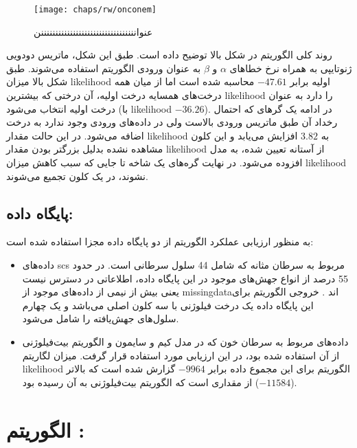 \begin{figure}[!ht]
	\centerline{\texttt{[image: chaps/rw/onconem]}}
	\caption{عنوانننننننننننننننننننننننننننننننننن}
	\label{fig:ch_rw:onconem}
\end{figure}


روند کلی الگوریتم  در شکل بالا توضیح داده است. طبق این شکل، ماتریس دودویی ژنوتایپی به همراه نرخ خطاهای $\alpha$ و $\beta$ به عنوان ورودی الگوریتم استفاده می‌شوند. طبق شکل بالا میزان \gls{likelihood} اولیه برابر $-47.61$  محاسبه شده است اما از میان همه درخت‌های همسایه درخت اولیه، آن درختی که بیشترین \gls{likelihood} را دارد به عنوان درخت اولیه انتخاب می‌شود (با \gls{likelihood} $-36.26$). در ادامه یک گرهای که احتمال رخداد آن طبق ماتریس ورودی بالاست ولی در داده‌های ورودی وجود ندارد به درخت اضافه می‌شود. در این حالت مقدار \gls{likelihood} به $3.82$ افزایش می‌یابد و این کلون مشاهده نشده بدلیل بزرگتر بودن مقدار \gls{likelihood} از آستانه تعیین شده، به مدل افزوده می‌شود. در نهایت گره‌های یک شاخه تا جایی که سبب کاهش میزان \gls{likelihood} نشوند، در یک کلون تجمیع می‌شوند. 


\subsection{پایگاه داده: }

به منظور ارزیابی عملکرد الگوریتم  از دو پایگاه داده مجزا استفاده شده است: 



\begin{itemize}
	\item     داده‌های  \gls{scs} مربوط به سرطان مثانه که شامل 44 سلول سرطانی است. در حدود 55 درصد از انواع جهش‌های موجود در این پایگاه داده، اطلاعاتی در دسترس نیست یعنی بیش از نیمی از داده‌های موجود از \gls{missingdata}‌اند . خروجی الگوریتم  برای این پایگاه داده یک درخت فیلوژنی با سه کلون اصلی می‌باشد و یک چهارم سلول‌های جهش‌یافته را شامل می‌شود.  
	\item     داده‌های مربوط به سرطان خون که در مدل کیم و سایمون و الگوریتم بیت‌فیلوژنی از آن استفاده شده بود، در این ارزیابی مورد استفاده قرار گرفت. میزان لگاریتم \gls{likelihood} الگوریتم  برای این مجموع داده برابر $-9964$ گزارش شده است که بالاتر از مقداری است که الگوریتم بیت‌فیلوژنی به آن رسیده بود ($-11584$).  
\end{itemize}


\section{الگوریتم :\cite{ross2016onconem}}

